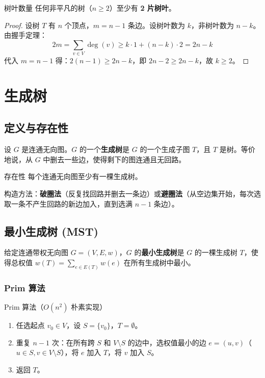 \begin{myTheorem}{树叶数量}
任何非平凡的树（$n \geq 2$）至少有 \textbf{2 片树叶}。
\end{myTheorem}

\begin{proof}
设树 $T$ 有 $n$ 个顶点，$m = n-1$ 条边。设树叶数为 $k$，非树叶数为 $n-k$。由握手定理：
\[
2m = \sum_{v\in V} \deg(v) \geq k \cdot 1 + (n-k) \cdot 2 = 2n - k
\]
代入 $m = n-1$ 得：$2(n-1) \geq 2n - k$，即 $2n-2 \geq 2n-k$，故 $k \geq 2$。
\end{proof}

\section{生成树}

\subsection{定义与存在性}

\begin{mydefinition}{}
设 $G$ 是连通无向图。$G$ 的一个\textbf{生成树}是 $G$ 的一个生成子图 $T$，且 $T$ 是树。等价地说，从 $G$ 中删去一些边，使得剩下的图连通且无回路。
\end{mydefinition}

\begin{myTheorem}{存在性}
每个连通无向图至少有一棵生成树。
\end{myTheorem}

构造方法：\textbf{破圈法}（反复找回路并删去一条边）或\textbf{避圈法}（从空边集开始，每次选取一条不产生回路的新边加入，直到选满 $n-1$ 条边）。

\subsection{最小生成树 (MST)}

\begin{mydefinition}{}
给定连通带权无向图 $G=(V,E,w)$，$G$ 的\textbf{最小生成树}是 $G$ 的一棵生成树 $T$，使得总权值 $w(T) = \sum_{e \in E(T)} w(e)$ 在所有生成树中最小。
\end{mydefinition}

\subsubsection{Prim 算法}

\begin{myalgorithm}{Prim 算法（$O(n^2)$ 朴素实现）}
\begin{enumerate}
    \item 任选起点 $v_0 \in V$，设 $S = \{v_0\}$，$T = \emptyset$。
    \item 重复 $n-1$ 次：在所有跨 $S$ 和 $V \setminus S$ 的边中，选权值最小的边 $e = (u,v)$（$u \in S, v \in V\setminus S$），将 $e$ 加入 $T$，将 $v$ 加入 $S$。
    \item 返回 $T$。
\end{enumerate}
\end{myalgorithm}

